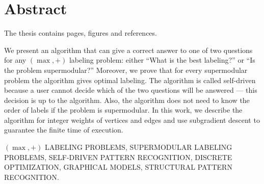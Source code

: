 \chapter*{Abstract}

The thesis contains
\pageref{LastPage}
pages,
figures
and
 references.

We present an algorithm that can give a correct answer
to one of two questions for any \((\max,+)\)
labeling problem: either ``What is the best labeling?'' or
``Is the problem supermodular?''
Moreover, we prove that for every supermodular problem
the algorithm gives optimal labeling.
The algorithm is called self-driven because a user
cannot decide which of the two questions will be answered
--- this decision is up to the algorithm.
Also, the algorithm
does not need to know the order of labels if the problem is supermodular.
In this work, we describe the algorithm for integer weights of vertices
and edges and use subgradient descent
to guarantee the finite time of execution.

\MakeUppercase{\((\max,+)\) labeling problems, supermodular labeling problems, self-driven pattern
recognition, discrete optimization, graphical models, structural pattern recognition.}

